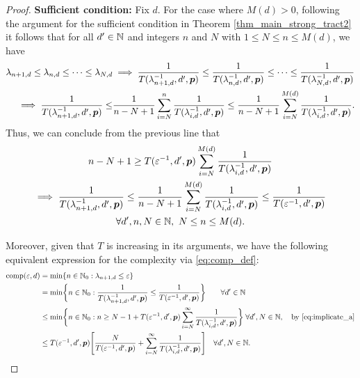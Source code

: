 \documentclass[11pt,a4paper]{article}
\begin{document}
\begin{proof}
\textbf{Sufficient condition:}\newline
Fix $d$.  For the case where $M(d)> 0$, following the argument for the sufficient condition in Theorem \ref{thm_main_strong_tract2} it follows that for all $d' \in \mathbb{N}$ and integers $n$ and $N$ with $1 \le N \le n \le M(d)$, we have
\begin{align*}
    \lambda_{n+1,d} \le \lambda_{n,d} \le \cdots \le \lambda_{N,d}
    & \implies \frac{1}{T(\lambda_{n+1, d}^{-1},d',\boldsymbol{p})} \le \frac{1}{T(\lambda_{n, d}^{-1},d',\boldsymbol{p})} \le \cdots \le \frac{1}{T(\lambda_{N, d}^{-1},d',\boldsymbol{p})} \\
     \implies \frac{1}{T(\lambda_{n+1, d}^{-1},d',\boldsymbol{p}) }
    \le &\frac{1}{n-N+1} \sum_{i=N}^n  \frac{1}{T(\lambda_{i, d}^{-1},d',\boldsymbol{p}) }
    \le \frac{1}{n-N+1} \sum_{i=N}^{M(d)}  \frac{1}{T(\lambda_{i, d}^{-1},d',\boldsymbol{p})}.
\end{align*}
Thus, we can conclude from the previous line that
\begin{multline} \label{eq:implicate_a_rest}
    n - N +1 \ge T(\varepsilon^{-1},d',\boldsymbol{p}) \sum_{i=N}^{M(d)} \frac{1}{T(\lambda_{i, d}^{-1},d',\boldsymbol{p})} \\
   \implies   \frac{1}{T(\lambda_{n+1, d}^{-1},d',\boldsymbol{p})} \le
   \frac{1}{n-N+1} \sum_{i=N}^{M(d)} \frac{1}{T(\lambda_{i, d}^{-1},d',\boldsymbol{p}) } \le \frac{1}{T(\varepsilon^{-1},d',\boldsymbol{p})} \\ \forall d', n, N \in \mathbb{N}, \ N \le n \le M(d).
\end{multline}

Moreover, given that $T$ is increasing in its arguments, we have the following equivalent expression for the complexity via \eqref{eq:comp_def}:
\begin{align} %
	\nonumber
	\comp(\varepsilon, d) & = \min \{n \in \natzero : \lambda_{n+1, d} \le \varepsilon\} \\
	\nonumber
	& = \min \biggl\{n \in \natzero : \frac{1}{T(\lambda_{n+1,d}^{-1},d',\vp)}\le \frac{1}{T(\varepsilon^{-1},d',\vp) }\biggr\} \qquad  \forall d'\in \naturals\\
	\nonumber
	& \le  \min \biggl\{n \in \natzero : n \ge N - 1 + T(\varepsilon^{-1},d',\vp) \sum_{i=N}^\infty \frac{1}{T(\lambda_{i, d}^{-1},d',\vp)} \biggr\} \;  \forall  d', N \in \naturals, \quad \text{by \eqref{eq:implicate_a}} \\ 
	& \le  T(\varepsilon^{-1},d',\vp) \Biggl [\frac{N}{T(\varepsilon^{-1},d',\vp)}  +  \sum_{i=N}^\infty \frac{1}{T(\lambda_{i, d}^{-1},d',\vp)} \Biggr] \quad \forall  d', N \in \naturals. \label{eq:compUP}
\end{align}


\end{proof}
\end{document}
